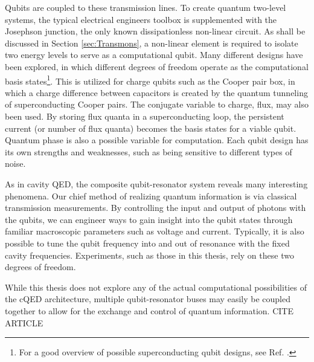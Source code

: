 \documentclass[11 pt, oneside]{book} %
\begin{document}
Qubits are coupled to these transmission lines. To create quantum two-level systems, the typical electrical engineers toolbox is supplemented with the Josephson junction, the only known dissipationless non-linear circuit\cite{Devoret}. As shall be discussed in Section \ref{sec:Transmons}, a non-linear element is required to isolate two energy levels to serve as a computational qubit. Many different designs have been explored, in which different degrees of freedom operate as the computational basis states\footnote{For a good overview of possible superconducting qubit designs, see Ref. \cite{Clarke}.}. This is utilized for charge qubits such as the Cooper pair box\cite{Nakamura}, in which a charge difference between capacitors is created by the quantum tunneling of superconducting Cooper pairs. The conjugate variable to charge, flux, may also been used. By storing flux quanta in a superconducting loop, the persistent current (or number of flux quanta) becomes the basis states for a viable qubit. Quantum phase is also a possible variable for computation. Each qubit design has its own strengths and weaknesses, such as being sensitive to different types of noise. 

As in cavity QED, the composite qubit-resonator system reveals many interesting phenomena. Our chief method of realizing quantum information is via classical transmission measurements. By controlling the input and output of photons with the qubits, we can engineer ways to gain insight into the qubit states through familiar macroscopic parameters such as voltage and current. Typically, it is also possible to tune the qubit frequency into and out of resonance with the fixed cavity frequencies. Experiments, such as those in this thesis, rely on these two degrees of freedom. 

While this thesis does not explore any of the actual computational possibilities of the cQED architecture, multiple qubit-resonator buses may easily be coupled together to allow for the exchange and control of quantum information. CITE ARTICLE
\end{document}
